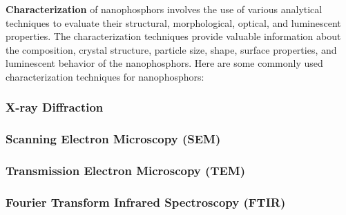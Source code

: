 \documentclass[../synthesisAndCharacter.tex]{subfiles}
\begin{document}
    \textbf{Characterization} of nanophosphors involves the use of various analytical techniques to evaluate their 
    structural, morphological, optical, and luminescent properties. The characterization techniques provide 
    valuable information about the composition, crystal structure, particle size, shape, surface properties, and 
    luminescent behavior of the nanophosphors. Here are some commonly used characterization techniques for 
    nanophosphors:

    \subsubsection{X-ray Diffraction}
        

    \subsubsection{Scanning Electron Microscopy (SEM) }
        

    \subsubsection{Transmission Electron Microscopy (TEM) }
        

    \subsubsection{Fourier Transform Infrared Spectroscopy (FTIR)}
        
\end{document}
